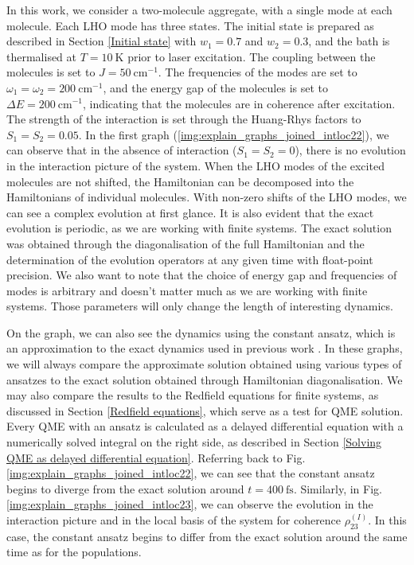 In this work, we consider a two-molecule aggregate, with a single mode at each molecule. Each LHO mode has three states. The initial state is prepared as described in Section \ref{Initial state} with $w_1=0.7$ and $w_2=0.3$, and the bath is thermalised at $T=10\:\mathrm{K}$ prior to laser excitation. The coupling between the molecules is set to $J=50\:\mathrm{cm}^{-1}$. The frequencies of the modes are set to $\omega_1=\omega_2=200\:\mathrm{cm}^{-1}$, and the energy gap of the molecules is set to $\Delta E=200\:\mathrm{cm}^{-1}$, indicating that the molecules are in coherence after excitation. The strength of the interaction is set through the Huang-Rhys factors to $S_1=S_2=0.05$. In the first graph (\ref{img:explain_graphs_joined_intloc22}), we can observe that in the absence of interaction ($S_1=S_2=0$), there is no evolution in the interaction picture of the system. When the LHO modes of the excited molecules are not shifted, the Hamiltonian can be decomposed into the Hamiltonians of individual molecules. With non-zero shifts of the LHO modes, we can see a complex evolution at first glance. It is also evident that the exact evolution is periodic, as we are working with finite systems. The exact solution was obtained through the diagonalisation of the full Hamiltonian and the determination of the evolution operators at any given time with float-point precision. We also want to note that the choice of energy gap and frequencies of modes is arbitrary and doesn't matter much as we are working with finite systems. Those parameters will only change the length of interesting dynamics. 

On the graph, we can also see the dynamics using the constant ansatz, which is an approximation to the exact dynamics used in previous work \cite{herman_elektron-fononova_2020}. In these graphs, we will always compare the approximate solution obtained using various types of ansatzes to the exact solution obtained through Hamiltonian diagonalisation. We may also compare the results to the Redfield equations for finite systems, as discussed in Section \ref{Redfield equations}, which serve as a test for QME solution. Every QME with an ansatz is calculated as a delayed differential equation with a numerically solved integral on the right side, as described in Section \ref{Solving QME as delayed differential equation}. Referring back to Fig. \ref{img:explain_graphs_joined_intloc22}, we can see that the constant ansatz begins to diverge from the exact solution around $t=400\:\mathrm{fs}$. Similarly, in Fig.  \ref{img:explain_graphs_joined_intloc23}, we can observe the evolution in the interaction picture and in the local basis of the system for coherence $\rho^{(I)}_{23}$. In this case, the constant ansatz begins to differ from the exact solution around the same time as for the populations. 

